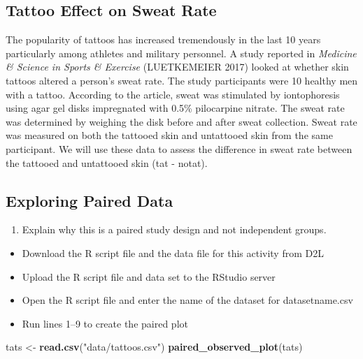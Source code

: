 \documentclass[
]{report}
\newenvironment{Shaded}{\begin{snugshade}}{\end{snugshade}}
\newcommand{\FunctionTok}[1]{\textcolor[rgb]{0.13,0.29,0.53}{\textbf{#1}}}
\newcommand{\NormalTok}[1]{#1}
\newcommand{\OtherTok}[1]{\textcolor[rgb]{0.56,0.35,0.01}{#1}}
\newcommand{\StringTok}[1]{\textcolor[rgb]{0.31,0.60,0.02}{#1}}
\providecommand{\tightlist}{%
  \setlength{\itemsep}{0pt}\setlength{\parskip}{0pt}}
\begin{document}
\subsection{Tattoo Effect on Sweat Rate}\label{tattoo-effect-on-sweat-rate}

The popularity of tattoos has increased tremendously in the last 10 years particularly among athletes and military personnel. A study reported in \emph{Medicine \& Science in Sports \& Exercise} (LUETKEMEIER 2017) looked at whether skin tattoos altered a person's sweat rate. The study participants were 10 healthy men with a tattoo. According to the article, sweat was stimulated by iontophoresis using agar gel disks impregnated with 0.5\% pilocarpine nitrate. The sweat rate was determined by weighing the disk before and after sweat collection. Sweat rate was measured on both the tattooed skin and untattooed skin from the same participant. We will use these data to assess the difference in sweat rate between the tattooed and untattooed skin (tat - notat).

\subsection{Exploring Paired Data}\label{exploring-paired-data}

\begin{enumerate}
\def\labelenumi{\arabic{enumi}.}
\setcounter{enumi}{4}
\tightlist
\item
  Explain why this is a paired study design and not independent groups.
\end{enumerate}

\vspace{1in}

\begin{itemize}
\item
  Download the R script file and the data file for this activity from D2L
\item
  Upload the R script file and data set to the RStudio server
\item
  Open the R script file and enter the name of the dataset for datasetname.csv
\item
  Run lines 1--9 to create the paired plot
\end{itemize}

\begin{Shaded}
\begin{Highlighting}[]
\NormalTok{tats }\OtherTok{\textless{}{-}} \FunctionTok{read.csv}\NormalTok{(}\StringTok{"data/tattoos.csv"}\NormalTok{)}
\FunctionTok{paired\_observed\_plot}\NormalTok{(tats) }
\end{Highlighting}
\end{Shaded}
\end{document}
